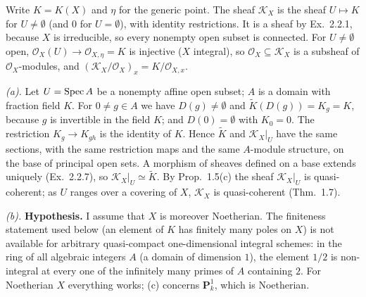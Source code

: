 \documentclass[11pt]{article}
\begin{document}
\pf
Write $K=K(X)$ and $\eta$ for the generic point. The sheaf $\mathcal K_X$ is the sheaf $U\mapsto K$ for $U\ne\emptyset$ (and $0$ for $U=\emptyset$), with identity restrictions. It is a sheaf by Ex.~2.2.1, because $X$ is irreducible, so every nonempty open subset is connected. For $U\ne\emptyset$ open, $\mathcal O_X(U)\to\mathcal O_{X,\eta}=K$ is injective ($X$ integral), so $\mathcal O_X\subseteq\mathcal K_X$ is a subsheaf of $\mathcal O_X$-modules, and $(\mathcal K_X/\mathcal O_X)_x=K/\mathcal O_{X,x}$.

\emph{(a).} Let $U=\operatorname{Spec} A$ be a nonempty affine open subset; $A$ is a domain with fraction field $K$. For $0\ne g\in A$ we have $D(g)\ne\emptyset$ and $\widetilde K(D(g))=K_g=K$, because $g$ is invertible in the field $K$; and $D(0)=\emptyset$ with $K_0=0$. The restriction $K_g\to K_{gh}$ is the identity of $K$. Hence $\widetilde K$ and $\mathcal K_X|_U$ have the same sections, with the same restriction maps and the same $A$-module structure, on the base of principal open sets. A morphism of sheaves defined on a base extends uniquely (Ex.~2.2.7), so $\mathcal K_X|_U\simeq\widetilde K$. By Prop.~1.5(c) the sheaf $\mathcal K_X|_U$ is quasi-coherent; as $U$ ranges over a covering of $X$, $\mathcal K_X$ is quasi-coherent (Thm.~1.7).

\emph{(b).} \textbf{Hypothesis.} I assume that $X$ is moreover Noetherian. The finiteness statement used below (an element of $K$ has finitely many poles on $X$) is not available for arbitrary quasi-compact one-dimensional integral schemes: in the ring of all algebraic integers $A$ (a domain of dimension $1$), the element $1/2$ is non-integral at every one of the infinitely many primes of $A$ containing $2$. For Noetherian $X$ everything works; (c) concerns $\mathbf P^1_k$, which is Noetherian.
\end{document}
